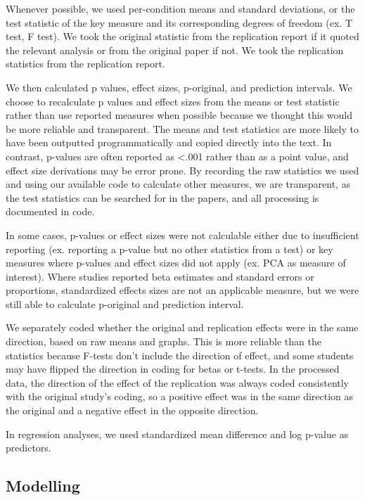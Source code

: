 \documentclass[
  english,
  a4paper,
]{article}
\begin{document}
Whenever possible, we used per-condition means and standard deviations, or the test statistic of the key measure and its corresponding degrees of freedom (ex. T test, F test). We took the original statistic from the replication report if it quoted the relevant analysis or from the original paper if not. We took the replication statistics from the replication report.

We then calculated p values, effect sizes, p-original, and prediction intervals. We choose to recalculate p values and effect sizes from the means or test statistic rather than use reported measures when possible because we thought this would be more reliable and transparent. The means and test statistics are more likely to have been outputted programmatically and copied directly into the text. In contrast, p-values are often reported as \textless.001 rather than as a point value, and effect size derivations may be error prone. By recording the raw statistics we used and using our available code to calculate other measures, we are transparent, as the test statistics can be searched for in the papers, and all processing is documented in code.

In some cases, p-values or effect sizes were not calculable either due to insufficient reporting (ex. reporting a p-value but no other statistics from a test) or key measures where p-values and effect sizes did not apply (ex. PCA as measure of interest). Where studies reported beta estimates and standard errors or proportions, standardized effects sizes are not an applicable measure, but we were still able to calculate p-original and prediction interval.

We separately coded whether the original and replication effects were in the same direction, based on raw means and graphs. This is more reliable than the statistics because F-tests don't include the direction of effect, and some students may have flipped the direction in coding for betas or t-tests. In the processed data, the direction of the effect of the replication was always coded consistently with the original study's coding, so a positive effect was in the same direction as the original and a negative effect in the opposite direction.

In regression analyses, we used standardized mean difference and log p-value as predictors.

\hypertarget{modelling}{%
\subsection{Modelling}\label{modelling}}
\end{document}
